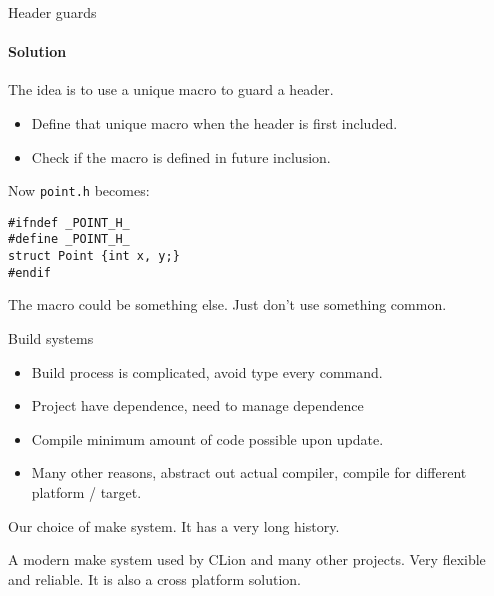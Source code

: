 \begin{frame}[fragile]{Header guards}
\framesubtitle{Solution}
The idea is to use a unique macro to guard a header.
\begin{itemize}
	\item Define that unique macro when the header is first included.
	\item Check if the macro is defined in future inclusion.
\end{itemize}

Now \texttt{point.h} becomes:

\begin{verbatim} 
#ifndef _POINT_H_
#define _POINT_H_
struct Point {int x, y;}
#endif
\end{verbatim}

The macro could be something else. Just don't use something common.

\end{frame}

\begin{frame}{Build systems}
\begin{itemize}
	\item Build process is complicated, avoid type every command.
	\item Project have dependence, need to manage dependence
	\item Compile minimum amount of code possible upon update.
	\item Many other reasons, abstract out actual compiler, compile for different platform / target.
\end{itemize}
\begin{description}
	\item[GNU/make] Our choice of make system. It has a very long history.
	\item[CMake] A modern make system used by CLion and many other projects. Very flexible and reliable. It is also a cross platform solution.
\end{description}
\end{frame}


